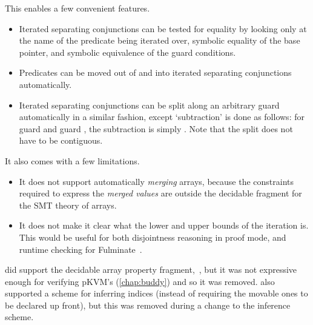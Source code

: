 This enables a few convenient features.
\begin{itemize}
    \item Iterated separating conjunctions can be tested for equality by
        looking only at the name of the predicate being iterated over, symbolic
        equality of the base pointer, and symbolic equivalence of the guard
        conditions.
    \item Predicates can be moved out of and into iterated separating conjunctions
        automatically.
    \item Iterated separating conjunctions can be split along an arbitrary
        guard automatically in a similar fashion, except `subtraction' is done as follows:
        for guard  and guard
        , %
        the subtraction is simply . Note that the split %
        does not have to be contiguous.
\end{itemize}

It also comes with a few limitations.
\begin{itemize}
    \item It does not support automatically \emph{merging} arrays, because the
        constraints required to express the \emph{merged values} are outside
        the decidable fragment for the SMT theory of arrays.
    \item It does not make it clear what the lower and upper bounds of the
        iteration is. This would be useful for both disjointness reasoning in
        proof mode, and runtime checking for
        Fulminate~.
\end{itemize}

 did support the decidable array property
fragment,~, but it was not expressive enough for
verifying pKVM's  (\cref{chap:buddy}) and so it was
removed.  also supported a scheme for inferring indices (instead of
requiring the movable ones to be declared up front), but this was removed
during a change to the inference
scheme.\label{sn:new-inf}

%
